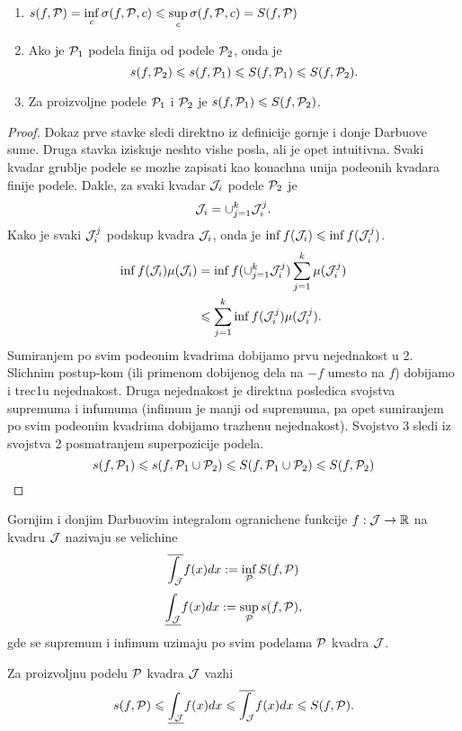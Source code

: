 \documentclass[../main.tex]{subfiles}
\begin{document}
    \begin{lem}
	\begin{enumerate}
	    \item $\displaystyle{s(f,\mathcal{P}) = \inf_c \sigma(f,\mathcal{P},c) \leqslant\sup_c \sigma(f,\mathcal{P},c) = S(f,\mathcal{P})}$
	    \item Ako je $\mathcal{P}_1$ podela finija od podele $\mathcal{P}_2$, onda je 
	    	\[s(f,\mathcal{P}_2) \leqslant s(f,\mathcal{P}_1) \leqslant S(f,\mathcal{P}_1) \leqslant S(f,\mathcal{P}_2).\] 
	    \item Za proizvoljne podele $\mathcal{P}_1$ i $\mathcal{P}_2$ je $s(f,\mathcal{P}_1) \leqslant S(f,\mathcal{P}_2)$. 
	\end{enumerate}
    \end{lem}

    \begin{proof}
    	Dokaz prve stavke sledi direktno iz definicije gornje i donje Darbuove sume. Druga stavka iziskuje neshto vishe posla, ali je opet intuitivna.
	Svaki kvadar grublje podele se mozhe zapisati kao konachna unija podeonih kvadara finije podele. Dakle, za svaki kvadar $\mathcal{J}_i$ podele $\mathcal{P}_2$ je 
	\[\mathcal{J}_i = \displaystyle{\cup_{j=1}^k \mathcal{J}_i^j}.\] Kako je svaki $\mathcal{J}_i^j$ podskup kvadra $\mathcal{J}_i$, onda  je $\inf f(\mathcal{J}_i) \leqslant \inf f(\mathcal{J}_i^j)$.
	\begin{align*}
	    \inf f(\mathcal{J}_i)\mu(\mathcal{J}_i) &= \inf f(\displaystyle{\cup_{j=1}^k \mathcal{J}_i^j})\sum_{j=1}^k\mu(\mathcal{J}_i^j)\\
	    &\leqslant \sum_{j=1}^k \inf f(\mathcal{J}_i^j)\mu(\mathcal{J}_i^j). 
	\end{align*}
	Sumiranjem po svim podeonim kvadrima dobijamo prvu nejednakost u 2. Slichnim postup-kom (ili primenom dobijenog dela na $-f$ umesto na $f$) dobijamo i trec1u nejednakost.
	Druga nejednakost je direktna posledica svojstva supremuma i infumuma (infimum je manji od supremuma, pa opet sumiranjem po svim podeonim kvadrima dobijamo trazhenu nejednakost).
	Svojstvo 3 sledi iz svojstva 2 posmatranjem superpozicije podela.
	\[s(f,\mathcal{P}_1) \leqslant s(f,\mathcal{P}_1 \cup \mathcal{P}_2)\leqslant S(f,\mathcal{P}_1\cup \mathcal{P}_2)\leqslant S(f,\mathcal{P}_2)\]
    \end{proof}

    \begin{de}
    	Gornjim i donjim Darbuovim integralom ogranichene funkcije $f:\mathcal{J} \to \mathbb{R}$ na kvadru $\mathcal{J}$ nazivaju se velichine
	\[ \overline{\int_{\mathcal{J}}}f(x)dx:= \inf_{\mathcal P} S(f,\mathcal{P}) \] \[\underline{\int_{\mathcal{J}}} f(x)dx:= \sup_{\mathcal P} s(f,\mathcal{P}),\]
	gde se supremum i infimum uzimaju po svim podelama $\mathcal P$ kvadra  $\mathcal{J}$.
    \end{de}

    \begin{posl}
    	Za proizvoljnu podelu $\mathcal P$ kvadra $\mathcal{J}$ vazhi 
	\[s(f,\mathcal{P}) \leqslant\underline{\int_{\mathcal{J}}}f(x)dx\leqslant\overline{\int_{\mathcal{J}}}f(x)dx \leqslant S(f,\mathcal{P}).\] 
    \end{posl}
\end{document}
